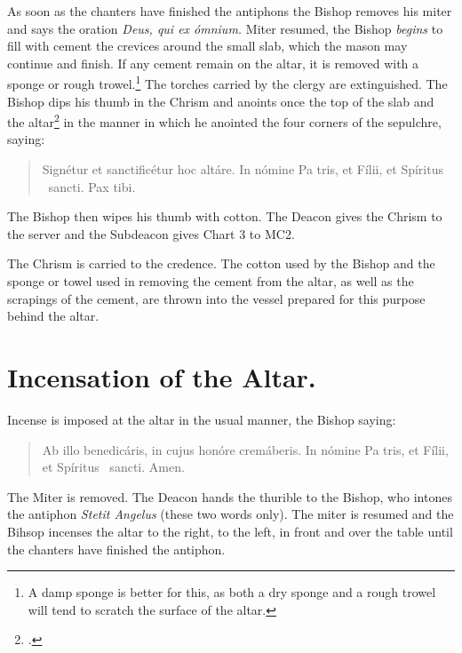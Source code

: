 \documentclass[letterpaper]{report}
\begin{document}
{\rubric As soon as the chanters have finished the antiphons the Bishop removes
his miter and says the oration \textit{Deus, qui ex ómnium.} Miter resumed, the
Bishop \textit{begins} to fill with cement the crevices around the small slab,
which the mason may continue and finish. If any cement remain on the altar, it
is removed with a sponge or rough trowel.\footnote{A damp sponge is better for
this, as both a dry sponge and a rough trowel will tend to scratch the surface
of the altar.} The torches carried by the clergy are extinguished. The Bishop
dips his thumb in the Chrism and anoints once the top of the slab and the
altar\footcite[Martinucci, Hartmann, etc., say that the cross should be made
not only on the slab, but also on the portions of the table of the altar near
the slab as indicated by the cut.][footnote 1, p. 90.]{consecranda} in the
manner in which he anointed the four corners of the sepulchre, saying:

\begin{quote}
    Signé\cross tur et sancti\cross ficétur hoc altáre. In nómine Pa\cross
    tris, et Fí\cross lii, et Spíritus \cross\ sancti. Pax tibi.
\end{quote}

The Bishop then wipes his thumb with cotton. The Deacon gives the Chrism to the
server and the Subdeacon gives Chart 3 to MC2.

The Chrism is carried to the credence. The cotton used by the Bishop and the
sponge or towel used in removing the cement from the altar, as well as the
scrapings of the cement, are thrown into the vessel prepared for this purpose
behind the altar.

\section{Incensation of the Altar.}

\rubric Incense is imposed at the altar in the usual manner, the Bishop saying:

\begin{quote}
   Ab illo benedicáris, in cujus honóre cremáberis. In nómine Pa\cross
    tris, et Fí\cross lii, et Spíritus \cross\ sancti. \rbar Amen.
\end{quote}

The Miter is removed. The Deacon hands the thurible to the Bishop, who intones
the antiphon \textit{Stetit Angelus} (these two words only). The miter is
resumed and the Bihsop incenses the altar to the right, to the left, in front
and over the table until the chanters have finished the antiphon.

}
\end{document}
